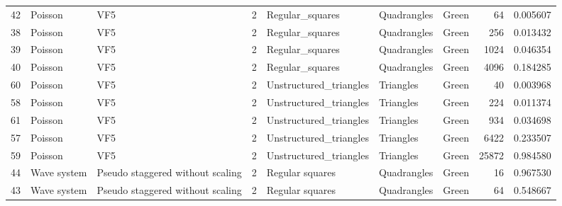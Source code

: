 \begin{tabular}{lllrlllrr}
42 &      Poisson &                               VF5 &               2 &                 Regular\_squares &           Quadrangles  &      Green &                       64 &                         0.005607 \\
38 &      Poisson &                               VF5 &               2 &                 Regular\_squares &           Quadrangles  &      Green &                      256 &                         0.013432 \\
39 &      Poisson &                               VF5 &               2 &                 Regular\_squares &           Quadrangles  &      Green &                     1024 &                         0.046354 \\
40 &      Poisson &                               VF5 &               2 &                 Regular\_squares &           Quadrangles  &      Green &                     4096 &                         0.184285 \\
60 &      Poisson &                               VF5 &               2 &          Unstructured\_triangles &             Triangles  &      Green &                       40 &                         0.003968 \\
58 &      Poisson &                               VF5 &               2 &          Unstructured\_triangles &             Triangles  &      Green &                      224 &                         0.011374 \\
61 &      Poisson &                               VF5 &               2 &          Unstructured\_triangles &             Triangles  &      Green &                      934 &                         0.034698 \\
57 &      Poisson &                               VF5 &               2 &          Unstructured\_triangles &             Triangles  &      Green &                     6422 &                         0.233507 \\
59 &      Poisson &                               VF5 &               2 &          Unstructured\_triangles &             Triangles  &      Green &                    25872 &                         0.984580 \\
44 &  Wave system &  Pseudo staggered without scaling &               2 &                 Regular squares &           Quadrangles  &      Green &                       16 &                         0.967530 \\
43 &  Wave system &  Pseudo staggered without scaling &               2 &                 Regular squares &           Quadrangles  &      Green &                       64 &                         0.548667 \\

\end{tabular}
